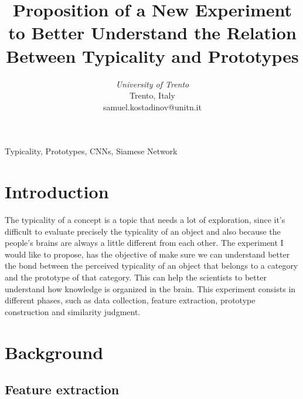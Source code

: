 \documentclass[conference]{IEEEtran}
\begin{document}
\title{Proposition of a New Experiment to Better Understand the Relation Between Typicality and Prototypes}



\author{
\textit{University of Trento}\\
Trento, Italy \\
samuel.kostadinov@unitn.it}


\maketitle

\begin{abstract}

	

\end{abstract}

\begin{IEEEkeywords}
Typicality, Prototypes, CNNs, Siamese Network
\end{IEEEkeywords}


\section{Introduction}
	
	The typicality of a concept is a topic that needs a lot of exploration, since it's difficult to evaluate precisely the typicality of an object 
	and also because the people's brains are always a little different from each other. The experiment I would like to propose, has the objective of 
	make sure we can understand better the bond between the perceived typicality of an object that belongs to a category and the prototype of that category.
	This can help the scientists to better understand how knowledge is organized in the brain. This experiment consists in different phases, such as
	data collection, feature extraction, prototype construction and similarity judgment.


\section{Background}

	\subsection{Feature extraction}
\end{document}

